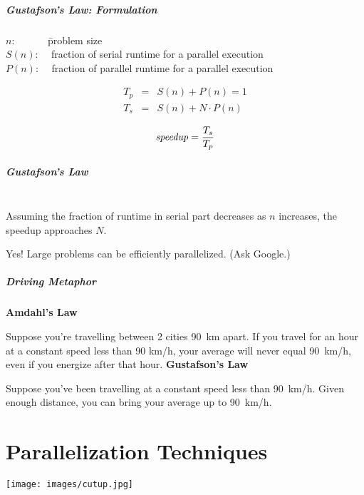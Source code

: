 \begin{frame}
  \frametitle{Gustafson's Law: Formulation}

\hspace*{2em} 
\begin{tabbing}
  $n$:~~~~~~ \= problem size\\[.1em]

  $S(n)$:~~ \> fraction of serial runtime for a parallel execution\\[.1em]

  $P(n)$:~~ \> fraction of parallel runtime for a parallel execution\\
\end{tabbing}


\begin{eqnarray*}
T_p &=& S(n) + P(n) = 1 \\
T_s &=& S(n) + N \cdot P(n) 
\end{eqnarray*}

\[ \mbox{\em speedup} = \frac{T_s}{T_p} \]
\end{frame}

\begin{frame}
  \frametitle{Gustafson's Law}

\hspace*{2em}
  \\[1em]

  Assuming the fraction of runtime in serial part decreases as $n$ increases,
  the speedup approaches $N$.


Yes! Large problems can be efficiently parallelized. (Ask Google.)

\end{frame}

\begin{frame}
  \frametitle{Driving Metaphor}

  {\bf Amdahl's Law}
  
  Suppose you're travelling between 2 cities 90~km apart. If you travel for an
  hour at a constant speed less than 90 km/h, your average will never equal
  90~km/h, even if you energize after that hour.
  \vfill
  {\bf Gustafson's Law}

  Suppose you've been travelling at a constant speed less than 90~km/h. Given
  enough distance, you can bring your average up to 90~km/h.
\end{frame}

\part{Parallelization Techniques}
\begin{frame}
\partpage
\begin{center}
	\texttt{[image: images/cutup.jpg]}
\end{center}
\end{frame}

